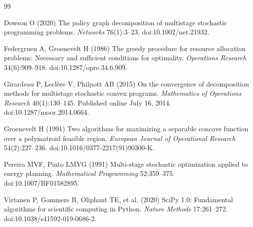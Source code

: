 \begin{thebibliography}{99}\raggedright
{}
Dowson O (2020) The policy graph decomposition of multistage stochastic programming problems. \emph{Networks} 76(1):3--23. doi:10.1002/net.21932.

Federgruen A, Groenevelt H (1986) The greedy procedure for resource allocation problems: Necessary and sufficient conditions for optimality. \emph{Operations Research} 34(6):909--918. doi:10.1287/opre.34.6.909.

Girardeau P, Lecl\`ere V, Philpott AB (2015) On the convergence of decomposition methods for multistage stochastic convex programs. \emph{Mathematics of Operations Research} 40(1):130--145. Published online July 16, 2014. doi:10.1287/moor.2014.0664.

Groenevelt H (1991) Two algorithms for maximizing a separable concave function over a polymatroid feasible region. \emph{European Journal of Operational Research} 54(2):227--236. doi:10.1016/0377-2217(91)90300-K.

Pereira MVF, Pinto LMVG (1991) Multi-stage stochastic optimization applied to energy planning. \emph{Mathematical Programming} 52:359--375. doi:10.1007/BF01582895.

Virtanen P, Gommers R, Oliphant TE, et al. (2020) SciPy 1.0: Fundamental algorithms for scientific computing in Python. \emph{Nature Methods} 17:261--272. doi:10.1038/s41592-019-0686-2.
\end{thebibliography}
